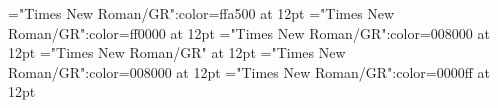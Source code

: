 \documentclass[a4paper]{article}
\begin{document}
\pagestyle{plain}
\sloppy
\setlength{\parfillskip}{0pt plus 1fil}
\font\xitemen="Times New Roman/GR":color=ffa500 at 12pt
\font\xitemmain="Times New Roman/GR":color=ff0000 at 12pt
\font\xitemenxitem="Times New Roman/GR":color=008000 at 12pt
\font\main="Times New Roman/GR" at 12pt
\font\xitemenmain="Times New Roman/GR":color=008000 at 12pt
\font\xitemmain="Times New Roman/GR":color=0000ff at 12pt

\mbox{} 
\newpage 
\newpage 
\setcounter{page}{1} 
\pagestyle{fancy} 








\end{document}
